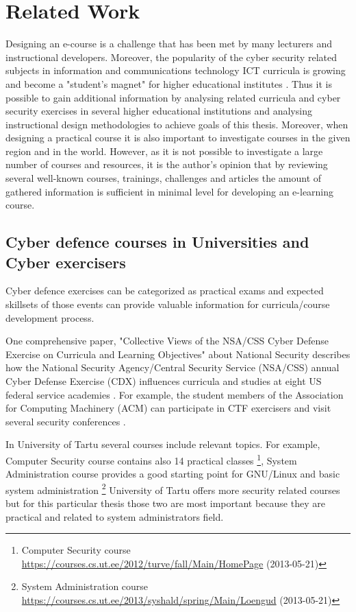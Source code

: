 \section{Related Work}
\label{Related Work}
Designing an e-course is a challenge that has been met by many lecturers and instructional developers. Moreover, the popularity of the cyber security related subjects in information and communications technology ICT curricula is growing and become a "student’s magnet" for higher educational institutes \citep{CyberIsHot}. Thus it is possible to gain additional information by analysing related curricula and cyber security exercises  in several higher educational institutions and analysing instructional design methodologies to achieve goals of this thesis. Moreover, when designing a practical course it is also important to investigate courses in the given region and in the world. However, as it is not possible to investigate a large number of courses and resources, it is the author’s opinion that by reviewing several well-known courses, trainings, challenges and articles the amount of gathered information is sufficient in minimal level for developing an e-learning course.


\subsection{Cyber defence courses in Universities and Cyber exercisers}
Cyber defence exercises can be categorized as practical exams and  expected skillsets of those events  can provide valuable information for curricula/course development process.

One comprehensive paper, "Collective Views of the NSA/CSS Cyber Defense Exercise
on Curricula and Learning Objectives" about National Security describes how the National Security
Agency/Central Security Service (NSA/CSS) annual Cyber Defense Exercise (\gls{CDX}) influences curricula and studies at eight US federal service academies \citep{adams_CDX_curricula}. For example, the student members of the Association for Computing Machinery (ACM) can participate in \gls{CTF} exercisers and  visit several security conferences \citep{adams_CDX_curricula}.

In University of Tartu several courses include relevant topics. For example, Computer Security course  contains also 14 practical classes \footnote{Computer Security course   \url{https://courses.cs.ut.ee/2012/turve/fall/Main/HomePage} (2013-05-21)}, System Administration course  provides a good starting point for GNU/Linux and basic system administration \footnote{ System Administration course  \url{https://courses.cs.ut.ee/2013/syshald/spring/Main/Loengud} (2013-05-21)}
University of Tartu offers more security related courses but for this particular thesis those two are most important because they are practical and related to system administrators field.

